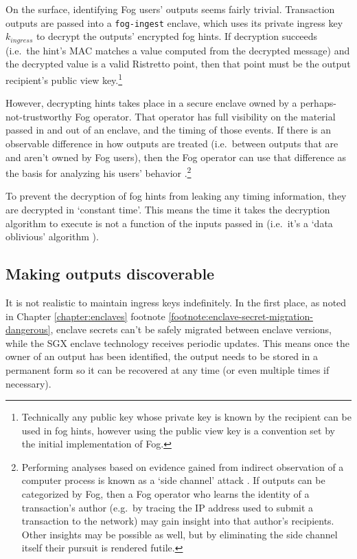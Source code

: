 On the surface, identifying Fog users' outputs seems fairly trivial. Transaction outputs are passed into a {\tt fog-ingest} enclave, which uses its private ingress key $k_{ingress}$ to decrypt the outputs' encrypted fog hints. If decryption succeeds (i.e.\ the hint's MAC matches a value computed from the decrypted message) and the decrypted value is a valid Ristretto point, then that point must be the output recipient's public view key.\footnote{Technically any public key whose private key is known by the recipient can be used in fog hints, however using the public view key is a convention set by the initial implementation of Fog.}

However, decrypting hints takes place in a secure enclave owned by a perhaps-not-trustworthy Fog operator. That operator has full visibility on the material passed in and out of an enclave, and the timing of those events. If there is an observable difference in how outputs are treated (i.e.\ between outputs that are and aren't owned by Fog users), then the Fog operator can use that difference as the basis for analyzing his users' behavior \cite{privacy-properties-mobilecoin-fog}.\footnote{Performing analyses based on evidence gained from indirect observation of a computer process is known as a `side channel' attack \cite{nist-side-channel-attack-def}. If outputs can be categorized by Fog, then a Fog operator who learns the identity of a transaction's author (e.g.\ by tracing the IP address used to submit a transaction to the network) may gain insight into that author's recipients. Other insights may be possible as well, but by eliminating the side channel itself their pursuit is rendered futile.}

To prevent the decryption of fog hints from leaking any timing information, they are decrypted in `constant time'. This means the time it takes the decryption algorithm to execute is not a function of the inputs passed in (i.e.\ it's a `data oblivious' algorithm \cite{data-oblivious-data-structures}).


\subsection{Making outputs discoverable}
\label{subsec:fog-making-outputs-discoverable}

It is not realistic to maintain ingress keys indefinitely. In the first place, as noted in Chapter \ref{chapter:enclaves} footnote \ref{footnote:enclave-secret-migration-dangerous}, enclave secrets can't be safely migrated between enclave versions, while the SGX enclave technology receives periodic updates. This means once the owner of an output has been identified, the output needs to be stored in a permanent form so it can be recovered at any time (or even multiple times if necessary).

